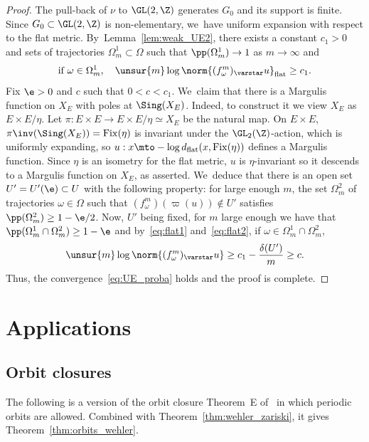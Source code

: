 \begin{proof}
The pull-back of
$\nu$ to $\GL(2, \Z)$ generates $G_0$ and its support is finite. Since $G_0\subset \GL(2, \Z)$ is non-elementary, we~have uniform expansion with respect to the flat metric. By~Lemma~\ref{lem:weak_UE2},
there exists a constant $c_1>0$ and sets of trajectories
$\Omega_m^1\subset \Omega$ such that $\pp(\Omega_m^1)\to 1$ as $m\to \infty$
and
\begin{equation}\label{eq:flat2}
\text{if }\omega\in \Omega_m^1, \quad
\unsur{m}\log \norm{(f_\omega^m)_\varstar u}_{\mathrm{flat}} \geq c_1 .
\end{equation}
Fix $\e>0$ and $c$ such that $0<c<c_1$. We~claim that there is a Margulis function on $X_E$ with poles at
$\Sing(X_E)$.
Indeed, to construct it we view $X_E$ as $E\times E/ \eta$. Let
$\pi:E\times E\to E\times E/\eta \simeq X_E$ be the natural map.
On
$E\times E$, $\pi\inv(\Sing (X_E)) =\mathrm{Fix}(\eta)$ is invariant under the $\GL_2(\Z)$-action, which
is uniformly expanding, so $ u :x\mto - \log d_{\mathrm{flat}}(x, \mathrm{Fix}(\eta))$ defines a
Margulis function. Since $\eta$ is an isometry for the flat metric, $u$ is
$\eta$-invariant so it descends to a Margulis function on $X_E$, as asserted. We~deduce that there is an open set $U' = U'(\e)\subset U$ with the following property:
for large enough $m$,
the set $\Omega_m^2$ of trajectories $\omega\in \Omega$ such that
$(f_\omega^m)(\varpi(u)) \notin U'$ satisfies $\pp(\Omega_m^2)\geq 1-\e/2$. Now,
$U'$ being fixed, for $m$ large enough we have that $\pp(\Omega_m^1\cap \Omega_m^2)\geq 1-\e$ and
by~\eqref{eq:flat1} and~\eqref{eq:flat2}, if $\omega \in \Omega_m^1\cap \Omega_m^2$,
\begin{equation*}
\unsur{m}\log \norm{(f_\omega^m)_\varstar u}\geq c_1 - \frac{\delta(U')}{m}\geq c.
\end{equation*}
Thus, the convergence~\eqref{eq:UE_proba} holds and the proof is complete.
\end{proof}

\section{Applications}\label{sec:applications}

\subsection{Orbit closures}
The following is a version of the orbit closure Theorem~E of~\cite{invariant} in which
periodic orbits are allowed.
Combined with Theorem~\ref{thm:wehler_zariski}, it gives
Theorem~\ref{thm:orbits_wehler}.

